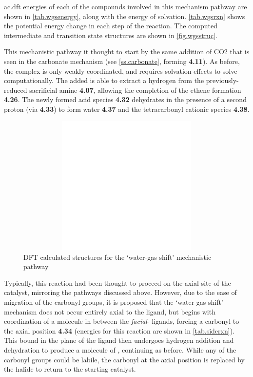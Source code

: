 \Gls{ac.dft} energies of each of the compounds involved in this mechanism pathway are shown in \autoref{tab.wgsenergy}, along with the energy of solvation. \autoref{tab.wgsrxn} shows the potential energy change in each step of the reaction. The computed intermediate and transition state structures are shown in \autoref{fig.wgsstruc}.



This mechanistic pathway it thought to start by the same addition of CO2 that is seen in the carbonate mechanism (see \autoref{ss.carbonate}, forming \textbf{4.11}).  As before, the complex is only weakly coordinated, and requires solvation effects to solve computationally. The added  is able to extract a hydrogen from the previously-reduced sacrificial amine \textbf{4.07}, allowing the completion of the ethene formation \textbf{4.26}. The newly formed acid species \textbf{4.32} dehydrates in the presence of a second proton (via \textbf{4.33}) to form water \textbf{4.37} and the tetracarbonyl cationic species \textbf{4.38}. 

\begin{figure}[!ht]
 \begin{center}
  \includegraphics[clip=true, width=120mm, height=70mm, keepaspectratio]{images/insertgraphic.eps}
 \end{center}
\caption{DFT calculated structures for the `water-gas shift' mechanistic pathway}
\label{fig.wgsstruc}
\end{figure} 

Typically, this reaction had been thought to proceed on the axial site of the catalyst, mirroring the pathways discussed above. However, due to the ease of migration of the carbonyl groups, it is proposed that the `water-gas shift' mechanism does not occur entirely axial to the ligand, but begins with coordination of a  molecule in between the \textit{facial}- ligands, forcing a carbonyl to the axial position \textbf{4.34} (energies for this reaction are shown in \autoref{tab.siderxn}). This  bound in the plane of the ligand then undergoes hydrogen addition and dehydration to produce a molecule of , continuing as before. While any of the carbonyl groups could be labile, the carbonyl at the axial position is replaced by the halide to return to the starting catalyst\autocite{shaver1992}. 

